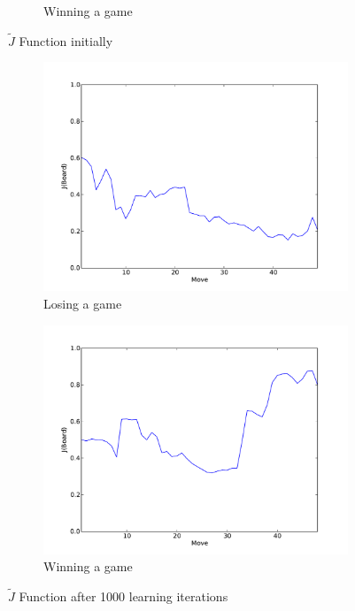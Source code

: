 \documentclass[11pt]{article}
\begin{document}
\begin{figure}[htbp]
\begin{subfigure}{0.45\textwidth}
    \caption{Winning a game}
    \label{fig:initial_j_win}
  \end{subfigure}
  \caption{$\tilde{J}$ Function initially}
  \label{fig:initial_j}
\end{figure}

\begin{figure}[htbp]
  \begin{subfigure}{0.45\textwidth}
    \centering
    \includegraphics[width=\linewidth]{../Graphs/J_improved_1000iteration_lost.pdf}
    \caption{Losing a game}
    \label{fig:learned_j_lost}
  \end{subfigure}
  \hspace{1em}
  \begin{subfigure}{0.45\textwidth}
    \centering
    \includegraphics[width=\linewidth]{../Graphs/J_improved_1000iteration_won.pdf}
    \caption{Winning a game}
    \label{fig:learned_j_win}
  \end{subfigure}
  \caption{$\tilde{J}$ Function after 1000 learning iterations}
  \label{fig:learned_j}
\end{figure}
\end{document}
